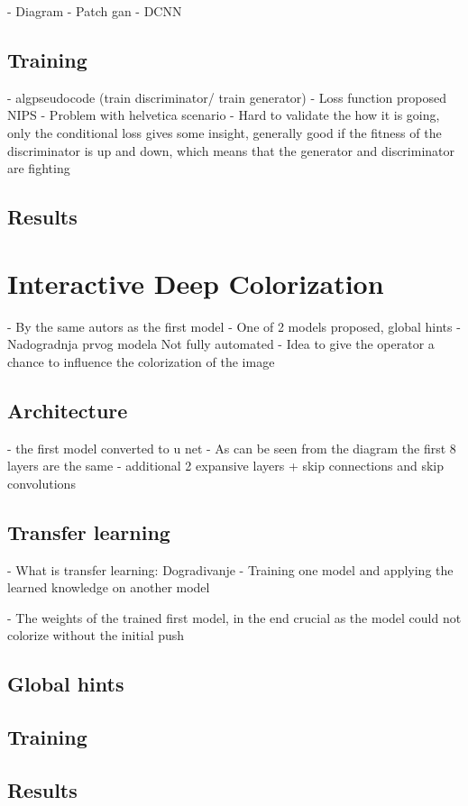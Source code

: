 - Diagram
- Patch gan
- DCNN

\subsection{Training}

- algpseudocode (train discriminator/ train generator)
- Loss function proposed NIPS \citep{goodfellow2017nips}
- Problem with helvetica scenario \citep{goodfellow2014generative}
- Hard to validate the how it is going, only the conditional loss gives some insight, generally good if the fitness of the discriminator is up and down, which means that the generator and discriminator are fighting

\subsection{Results}

\section{Interactive Deep Colorization}
\label{sec:ideep}

- By the same autors as the first model
- One of 2 models proposed, global hints
- Nadogradnja prvog modela
Not fully automated
- Idea to give the operator a chance to influence the colorization of the image

\subsection{Architecture}
- the first model converted to u net
- As can be seen from the diagram the first 8 layers are the same
- additional 2 expansive layers + skip connections and skip convolutions

\subsection{Transfer learning}

- What is transfer learning:
	Dogradivanje
	- Training one model and applying the learned knowledge on another model
	
- The weights of the trained first model, in the end crucial as the model could not colorize without the initial push

\subsection{Global hints}


\subsection{Training}

\subsection{Results}